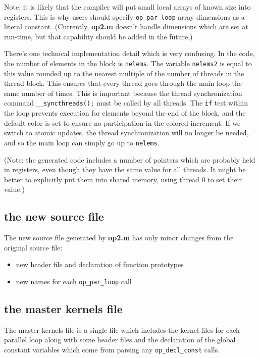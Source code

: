 \documentclass[12pt]{article}
\begin{document}
\newpage

Note: it is likely that the compiler will put small local arrays of 
known size into registers.  This is why users should specify
{\tt op\_par\_loop} array dimensions as a literal constant.
(Currently, {\bf op2.m} doesn't handle dimensions which are set at 
run-time, but that capability should be added in the future.)

There's one technical implementation detail which is very confusing.
In the code, the number of elements in the block is {\tt nelems}.
The variable {\tt nelems2} is equal to this value rounded up to the 
nearest multiple of the number of threads in the thread block.
This ensures that every thread goes through the main loop the same 
number of times.  This is important because the thread synchronization 
command {\tt \_\_syncthreads();} must be called by all threads.
The {\tt if} test within the loop prevents execution for elements
beyond the end of the block, and the default color is set to ensure
no participation in the colored increment.
If we switch to atomic updates, the thread synchronization will
no longer be needed, and so the main loop can simply go up to
{\tt nelems}.

(Note: the generated code includes a number of pointers 
which are probably held in registers, even though they have the 
same value for all threads.  It might be better to explicitly put 
them into shared memory, using thread 0 to set their value.)


\subsection{the new source file}

The new source file generated by {\bf op2.m} has only minor changes 
from the original source file:
\begin{itemize}
\item
new header file and declaration of function prototypes

\item
new names for each {\tt op\_par\_loop} call
\end{itemize}

\subsection{the master kernels file}

The master kernels file is a single file which includes the kernel 
files for each parallel loop along with some header files and the 
declaration of the global constant variables which come from parsing 
any {\tt op\_decl\_const} calls.
\end{document}
